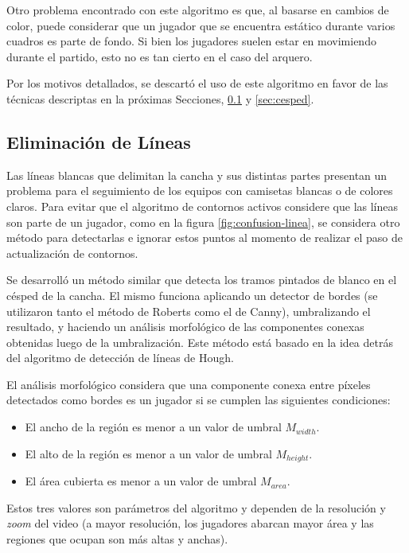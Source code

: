 Otro problema encontrado con este algoritmo es que, al basarse en cambios de color,
puede considerar que un jugador que se encuentra estático durante varios cuadros
es parte de fondo. Si bien los jugadores suelen estar en movimiendo durante el
partido, esto no es tan cierto en el caso del arquero.

Por los motivos detallados, se descartó el uso de este algoritmo en favor de las
técnicas descriptas en la próximas Secciones, \ref{sec:lineas} y \ref{sec:cesped}.

\subsection{Eliminación de Líneas}
\label{sec:lineas}

Las líneas blancas que delimitan la cancha y sus distintas partes presentan un
problema para el seguimiento de los equipos con camisetas blancas o de colores
claros. Para evitar que el algoritmo de contornos activos considere que las
líneas son parte de un jugador, como en la figura \ref{fig:confusion-linea}, se
considera otro método para detectarlas e ignorar estos puntos al momento de
realizar el paso de actualización de contornos.

Se desarrolló un método similar que detecta los tramos pintados de blanco en el
césped de la cancha. El mismo funciona aplicando un detector de bordes (se
utilizaron tanto el método de Roberts como el de Canny), umbralizando el
resultado, y haciendo un análisis morfológico de las componentes conexas
obtenidas luego de la umbralización.  Este método está basado en la idea detrás
del algoritmo de detección de líneas de Hough.

El análisis morfológico considera que una componente conexa entre píxeles
detectados como bordes es un jugador si se cumplen las siguientes condiciones:
\begin{itemize}
  \item El ancho de la región es menor a un valor de umbral $M_{width}$.
  \item El alto de la región es menor a un valor de umbral $M_{height}$.
  \item El área cubierta es menor a un valor de umbral $M_{area}$.
\end{itemize}

Estos tres valores son parámetros del algoritmo y dependen de la resolución y
\textit{zoom} del video (a mayor resolución, los jugadores abarcan mayor área y
las regiones que ocupan son más altas y anchas).


